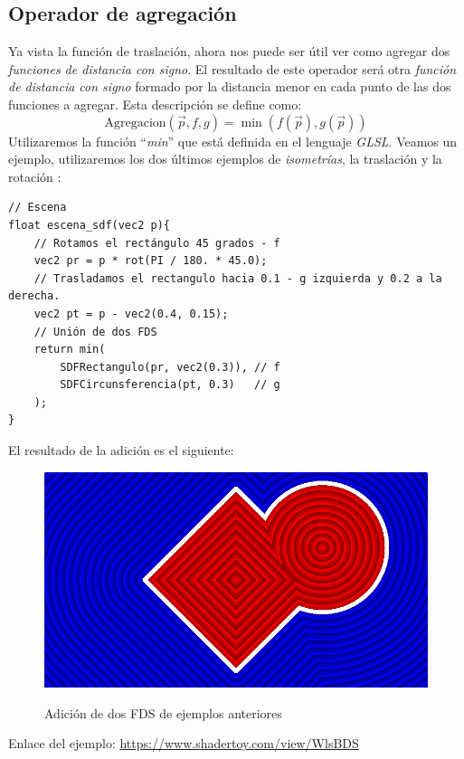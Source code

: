 \subsection{Operador de agregación}
Ya vista la función de traslación, ahora nos puede ser útil ver como agregar dos \textit{funciones de distancia con signo}. El resultado de este operador será otra \textit{función de distancia con signo} formado por la distancia menor en cada punto de las dos funciones a agregar. Esta descripción se define como:
\[\text{Agregacion}(\Vec{p}, f, g) = \min(f(\Vec{p}), g(\Vec{p})) \]
Utilizaremos la función \enquote{\textit{min}} que está definida en el lenguaje \textit{GLSL}. Veamos un ejemplo, utilizaremos los dos últimos ejemplos de \textit{isometrías}, la traslación  y la rotación :
\begin{lstlisting}
// Escena
float escena_sdf(vec2 p){
    // Rotamos el rectángulo 45 grados - f
    vec2 pr = p * rot(PI / 180. * 45.0);
    // Trasladamos el rectangulo hacia 0.1 - g izquierda y 0.2 a la derecha.
    vec2 pt = p - vec2(0.4, 0.15);
    // Unión de dos FDS
    return min(
        SDFRectangulo(pr, vec2(0.3)), // f
        SDFCircunsferencia(pt, 0.3)   // g
    );
}
\end{lstlisting}

El resultado de la adición es el siguiente:

\begin{figure}[H]
  \centering
  \captionsetup{justification=centering}%
  \includegraphics[width=1.0\textwidth]{secciones/imagenes/sdf/2d/sdf_add.png}\label{fig:add}
  \caption{ Adición de dos FDS de ejemplos anteriores}
\end{figure}

Enlace del ejemplo:
\url{https://www.shadertoy.com/view/WlsBDS}

